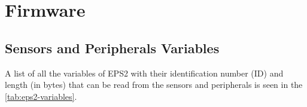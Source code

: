 %
%
%
%
%

%
%
%
%
%
%

\chapter{Firmware} \label{ch:firmware}

\section{Sensors and Peripherals Variables}

A list of all the variables of EPS2 with their identification number (ID) and length (in bytes) that can be read from the sensors and peripherals is seen in the \autoref{tab:eps2-variables}.

